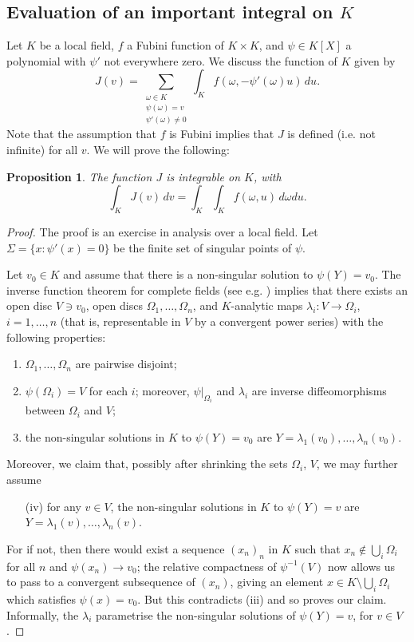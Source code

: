 \documentclass{lmsMODIFIED}
\newtheorem{proposition}[theorem]{Proposition}
\newcommand{\w}{\omega}
\begin{document}
\begin{appendix}
\section{Evaluation of an important integral on $K$}

Let $K$ be a local field, $f$ a Fubini function of $K\times K$, and $\psi\in K[X]$ a polynomial with $\psi'$ not everywhere zero. We discuss the function of $K$ given by \[J(v)=\sum_{\substack{\w\in K \\ \psi(\w)=v \\ \psi'(\w)\neq 0}}\int_K f(\w,-\psi'(\w)u)\,du.\] Note that the assumption that $f$ is Fubini implies that $J$ is defined (i.e. not infinite) for all $v$. We will prove the following:

\begin{proposition}
The function $J$ is integrable on $K$, with \[\int_K J(v)\,dv=\int_K\int_K f(\w,u)\,d\w du.\]
\end{proposition}
\begin{proof}
The proof is an exercise in analysis over a local field. Let $\Sigma=\{x:\psi'(x)=0\}$ be the finite set of singular points of $\psi$.

Let $v_0\in K$ and assume that there is a non-singular solution to $\psi(Y)=v_0$. The inverse function theorem for complete fields (see e.g. \cite{Igusa2000}) implies that there exists an open disc $V\ni v_0$, open discs $\Omega_1,\dots,\Omega_n$, and $K$-analytic maps $\lambda_i:V\to \Omega_i$, $i=1,\dots,n$ (that is, representable in $V$ by a convergent power series) with the following properties:
\begin{enumerate}
\item $\Omega_1,\dots,\Omega_n$ are pairwise disjoint;
\item $\psi(\Omega_i)=V$ for each $i$; moreover, $\psi|_{\Omega_i}$ and $\lambda_i$ are inverse diffeomorphisms between $\Omega_i$ and $V$;
\item the non-singular solutions in $K$ to $\psi(Y)=v_0$ are $Y=\lambda_1(v_0),\dots,\lambda_n(v_0)$.
\end{enumerate}
Moreover, we claim that, possibly after shrinking the sets $\Omega_i$, $V$, we may further assume
\begin{itemize}
\item[(iv)] for any $v\in V$, the non-singular solutions in $K$ to $\psi(Y)=v$ are $Y=\lambda_1(v),\dots,\lambda_n(v)$.
\end{itemize}
For if not, then there would exist a sequence $(x_n)_n$ in $K$ such that $x_n\notin\bigcup_i\Omega_i$ for all $n$ and $\psi(x_n)\to v_0$; the relative compactness of $\psi^{-1}(V)$ now allows us to pass to a convergent subsequence of $(x_n)$, giving an element $x\in K\setminus\bigcup_i \Omega_i$ which satisfies $\psi(x)=v_0$. But this contradicts (iii) and so proves our claim. Informally, the $\lambda_i$ parametrise the non-singular solutions of $\psi(Y)=v$, for $v\in V$.


\end{proof}
\end{appendix}
\end{document}
